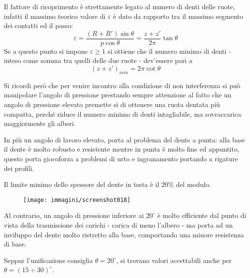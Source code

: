 \documentclass[a4paper, 15pt]{article}
\begin{document}
\begin{adjustwidth}{2in}{}
		Il fattore di ricoprimento è strettamente legato al numero di denti delle ruote, infatti il massimo teorico valore di $\varepsilon$ è dato da rapporto tra il massimo segmento dei contatti ed il passo:
		\[\varepsilon = \dfrac{(R+R')\sin\theta}{p\cos\theta} = \dfrac{z+z'}{2\pi}\tan\theta\]
		Se a questo punto si impone $\varepsilon\geq1$ si ottiene che il numero minimo di denti - inteso come somma tra quelli delle due ruote - dev'essere pari a
		\[(z+z')_{min} = 2\pi\cot\theta\]
		
		Si ricordi però che per venire incontro alla condizione di non interferenza si può manipolare l'angolo di pressione prestando sempre attenzione al fatto che un angolo di pressione elevato premette sì di ottenere una ruota dentata più compatta, perché riduce il numero minimo di denti intagliabile, ma sovraccarica maggiormente gli alberi.
		
		In più un angolo di lavoro elevato, porta al problema del dente a punta: alla base il dente è molto robusto e resistente mentre in punta è molto fine ed appuntito, questo porta giocoforza a problemi di urto e ingranamento portando a rigature dei profili. 
		
		Il limite minimo dello spessore del dente in testa è il 20\% del modulo. 
\begin{figure}[H]
	\centering
	\texttt{[image: immagini/screenshot018]}
	\label{fig:screenshot018}
\end{figure}		
		Al contrario, un angolo di pressione inferiore ai $20^\circ$ è molto efficiente dal punto di vista della trasmissione dei carichi - carica di meno l'albero - ma porta ad un inviluppo del dente molto ristretto alla base, comportando una minore resistenza di base. 
		
		Seppur l'unificazione consiglia $\theta = 20^\circ$, si trovano valori accettabili anche per $\theta = (15\div30)^\circ$. 
\end{adjustwidth}		 
\end{document}
